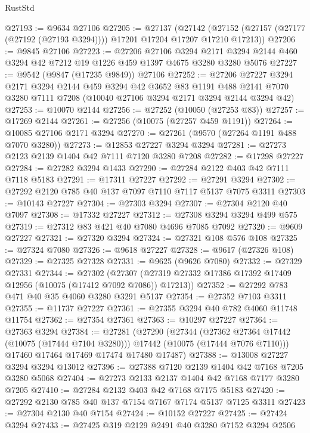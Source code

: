 \begin{lexlean}{RustStd}
\begin{coremodule}
@27193 := @9634 @27106
@27205 := @27137
    (@27142 (@27152 (@27157 (@27177 (@27192 (@27193 @3294)))) @17201 @17204 @17207 @17210 @17213))
@27206 := @9845 @27106
@27223 := @27206
    @27106
    @3294
    @2171
    @3294
    @2144
    @460
    @3294
    @42
    @7212
    @19
    @1226
    @459
    @1397
    @4675
    @3280
    @3280
    @5076
@27227 := @9542 (@9847 (@17235 @9849)) @27106
@27252 := @27206
    @27227
    @3294
    @2171
    @3294
    @2144
    @459
    @3294
    @42
    @3652
    @83
    @1191
    @488
    @2141
    @7070
    @3280
    @7111
    @7208
    (@10040 @27106 @3294 @2171 @3294 @2144 @3294 @42)
@27253 := @10070 @2144
@27256 := @27252 (@10050 (@27253 @83))
@27257 := @17269 @2144
@27261 := @27256 (@10075 (@27257 @459 @1191))
@27264 := @10085 @27106 @2171 @3294
@27270 := @27261 (@9570 (@27264 @1191 @488 @7070 @3280))
@27273 := @12853 @27227 @3294 @3294
@27281 := @27273 @2123 @2139 @1404 @42 @7111 @7120 @3280 @7208
@27282 := @17298 @27227
@27284 := @27282 @3294 @1433
@27290 := @27284 @2122 @403 @42 @7111 @7118 @5183
@27291 := @17311 @27227
@27292 := @27291 @3294
@27302 := @27292 @2120 @785 @40 @137 @7097 @7110 @7117 @5137 @7075 @3311
@27303 := @10143 @27227
@27304 := @27303 @3294
@27307 := @27304 @2120 @40 @7097
@27308 := @17332 @27227
@27312 := @27308 @3294 @3294 @499 @575
@27319 := @27312 @83 @421 @40 @7080 @4696 @7085 @7092
@27320 := @9609 @27227
@27321 := @27320 @3294
@27324 := @27321 @108 @576 @108
@27325 := @27324 @7080
@27326 := @9618 @27227
@27328 := @9617 (@27326 @108)
@27329 := @27325 @27328
@27331 := @9625 (@9626 @7080)
@27332 := @27329 @27331
@27344 := @27302
    (@27307 (@27319 @27332 @17386 @17392 @17409 @12956 (@10075 (@17412 @7092 @7086)) @17213))
@27352 := @27292 @783 @471 @40 @35 @4060 @3280 @3291 @5137
@27354 := @27352 @7103 @3311
@27355 := @11737 @27227
@27361 := @27355 @3294 @40 @782 @4060 @11748 @11754
@27362 := @27354 @27361
@27363 := @10297 @27227
@27364 := @27363 @3294
@27384 := @27281
    (@27290
      (@27344
        (@27362 @27364 @17442 (@10075 (@17444 @7104 @3280)))
        @17442
        (@10075 (@17444 @7076 @7110)))
      @17460
      @17464
      @17469
      @17474
      @17480
      @17487)
@27388 := @13008 @27227 @3294 @3294 @13012
@27396 := @27388 @7120 @2139 @1404 @42 @7168 @7205 @3280 @5068
@27404 := @27273 @2133 @2137 @1404 @42 @7168 @7177 @3280 @7205
@27410 := @27284 @2132 @403 @42 @7168 @7175 @5183
@27420 := @27292 @2130 @785 @40 @137 @7154 @7167 @7174 @5137 @7125 @3311
@27423 := @27304 @2130 @40 @7154
@27424 := @10152 @27227
@27425 := @27424 @3294
@27433 := @27425 @319 @2129 @2491 @40 @3280 @7152 @3294 @2506

\end{coremodule}
\end{lexlean}
